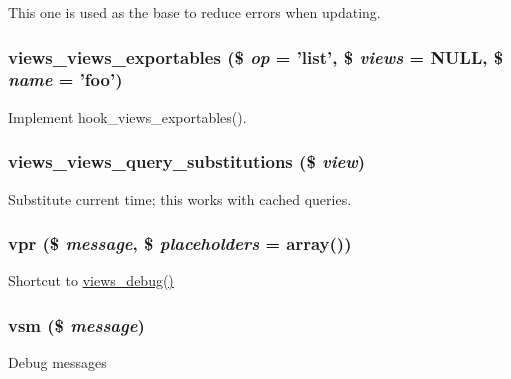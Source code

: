 This one is used as the base to reduce errors when updating. \hypertarget{views_8module_a132f41fd30b74a1be5592fd178ccdd85}{
\subsubsection[{views\_\-views\_\-exportables}]{\setlength{\rightskip}{0pt plus 5cm}views\_\-views\_\-exportables (\$ {\em op} = {\ttfamily 'list'}, \/  \$ {\em views} = {\ttfamily NULL}, \/  \$ {\em name} = {\ttfamily 'foo'})}}
\label{views_8module_a132f41fd30b74a1be5592fd178ccdd85}
Implement hook\_\-views\_\-exportables(). \hypertarget{views_8module_af14b36b042237ca5f054fc19c44a188c}{
\subsubsection[{views\_\-views\_\-query\_\-substitutions}]{\setlength{\rightskip}{0pt plus 5cm}views\_\-views\_\-query\_\-substitutions (\$ {\em view})}}
\label{views_8module_af14b36b042237ca5f054fc19c44a188c}
Substitute current time; this works with cached queries. \hypertarget{views_8module_aa69e09155c17e0432a42d8e2748164ab}{
\subsubsection[{vpr}]{\setlength{\rightskip}{0pt plus 5cm}vpr (\$ {\em message}, \/  \$ {\em placeholders} = {\ttfamily array()})}}
\label{views_8module_aa69e09155c17e0432a42d8e2748164ab}
Shortcut to \hyperlink{views_8module_adb6971e0ec522398d8262cc90438e0f9}{views\_\-debug()} \hypertarget{views_8module_a9f7435f9c80f93858758b82f6f0cc001}{
\subsubsection[{vsm}]{\setlength{\rightskip}{0pt plus 5cm}vsm (\$ {\em message})}}
\label{views_8module_a9f7435f9c80f93858758b82f6f0cc001}
Debug messages 